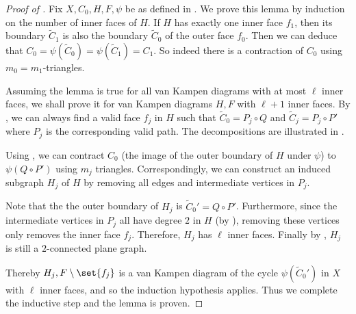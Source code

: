 \begin{proof}[Proof of ]
    Fix \(X,C_0,H,F,\psi\) be as defined in . We prove this lemma by induction on the number of inner faces of $H$. If $H$ has exactly one inner face \(f_1\), then its boundary $\tilde{C}_1$ is also the boundary $\tilde{C}_0$ of the outer face \(f_0\). Then we can deduce that $C_0 = \psi(\tilde{C}_0) = \psi(\tilde{C}_1) = C_1$. So indeed there is a contraction of \(C_0\) using \(m_{0}=m_1\)-triangles.
    
    Assuming the lemma is true for all van Kampen diagrams with at most \(\ell\) inner faces, we shall prove it for van Kampen diagrams $H,F$ with \(\ell+1\) inner faces.
    By , we can always find a valid face \(f_j\) in $H$ such that \(\tilde{C}_0 = P_j \circ Q\) and \(\tilde{C}_j = P_j \circ P'\) where \(P_j\) is the corresponding valid path. The decompositions are illustrated in .
    
    
    Using , we can contract \(C_0\) (the image of the outer boundary of $H$ under $\psi$) to \(\psi(Q \circ P')\) using \(m_{j}\) triangles. Correspondingly, we can construct an induced subgraph $H_j$ of $H$ by removing all edges and intermediate vertices in \(P_j\). 
    
    Note that the the outer boundary of $H_j$ is $\tilde{C}_0'=Q \circ P'$.
    Furthermore, since the intermediate vertices in $P_j$ all have degree $2$ in $H$ (by ), removing these vertices only removes the inner face $f_j$. Therefore, $H_j$ has $\ell$ inner faces.
    Finally by , $H_j$ is still a $2$-connected plane graph. 

    Thereby $H_j, F\setminus\set{f_j}$ is a van Kampen diagram of the cycle $\psi(\tilde{C}_0')$ in $X$ with $\ell$ inner faces, and so the induction hypothesis applies.
    Thus we complete the inductive step and the lemma is proven.       
\end{proof}



